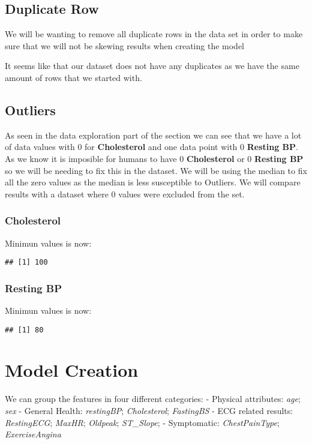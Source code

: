 \documentclass[
]{article}
\begin{document}
\subsection{Duplicate Row}\label{duplicate-row}

We will be wanting to remove all duplicate rows in the data set in order
to make sure that we will not be skewing results when creating the model

It seems like that our dataset does not have any duplicates as we have
the same amount of rows that we started with.

\subsection{Outliers}\label{outliers}

As seen in the data exploration part of the section we can see that we
have a lot of data values with 0 for \textbf{Cholesterol} and one data
point with 0 \textbf{Resting BP}. As we know it is imposible for humans
to have 0 \textbf{Cholesterol} or 0 \textbf{Resting BP} so we will be
needing to fix this in the dataset. We will be using the median to fix
all the zero values as the median is less susceptible to Outliers. We
will compare results with a dataset where 0 values were excluded from
the set.

\subsubsection{Cholesterol}\label{cholesterol}

Minimun values is now:

\begin{verbatim}
## [1] 100
\end{verbatim}

\subsubsection{Resting BP}\label{resting-bp}

Minimun values is now:

\begin{verbatim}
## [1] 80
\end{verbatim}

\section{Model Creation}\label{model-creation}

We can group the features in four different categories: - Physical
attributes: \emph{age}; \emph{sex} - General Health: \emph{restingBP};
\emph{Cholesterol}; \emph{FastingBS} - ECG related results:
\emph{RestingECG}; \emph{MaxHR}; \emph{Oldpeak}; \emph{ST\_Slope}; -
Symptomatic: \emph{ChestPainType}; \emph{ExerciseAngina}
\end{document}
